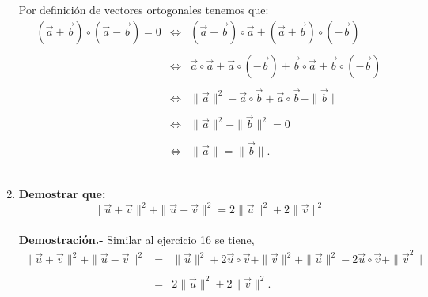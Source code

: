 \begin{enumerate}
    Por definición de vectores ortogonales tenemos que:
    $$\begin{array}{rcl}
	\left(\vec{a}+\vec{b}\right)\circ\left(\vec{a}-\vec{b}\right) = 0 &\Leftrightarrow&(\vec{a}+\vec{b})\circ \vec{a}+(\vec{a}+\vec{b})\circ (-\vec{b})\\\\
									  &\Leftrightarrow& \vec{a}\circ \vec{a}+\vec{a}\circ (-\vec{b})+\vec{b}\circ \vec{a}+\vec{b}\circ (-\vec{b})\\\\
									  &\Leftrightarrow& \|\vec{a}\|^2-\vec{a}\circ \vec{b}+\vec{a}\circ \vec{b}-\|\vec{b}\|\\\\
									  &\Leftrightarrow& \|\vec{a}\|^2-\|\vec{b}\|^2=0\\\\
									  &\Leftrightarrow& \|\vec{a}\|=\|\vec{b}\|.
    \end{array}$$
    \vspace{.4cm}\\


\item \textbf{\boldmath Demostrar que: $$\|\vec{u}+\vec{v}\|^2 + \|\vec{u}-\vec{v}\|^2 = 2\|\vec{u}\|^2+2\|\vec{v}\|^2$$\\
    Demostración.-}\; Similar al ejercicio 16 se tiene, 
    $$\begin{array}{rcl}
	\|\vec{u}+\vec{v}\|^2 + \|\vec{u}-\vec{v}\|^2 &=& \|\vec{u}\|^2 + 2\vec{u}\circ \vec{v} + \|\vec{v}\|^2 + \|\vec{u}\|^2 - 2\vec{u} \circ \vec{v} + \|\vec{v}^2\|\\\\
						      &=& 2\|\vec{u}\|^2 + 2\|\vec{v}\|^2.\\
    \end{array}$$\\


\end{enumerate}
